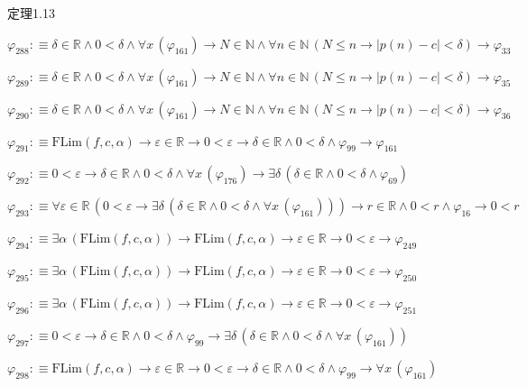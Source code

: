 \begin{fullproof}{定理1.13}
\begin{abbrevlist}
\item $\varphi_{288} :\equiv \delta \in \mathbb{R} \land 0 < \delta \land \forall x\,(\varphi_{161}) \to N \in \mathbb{N} \land \forall n \in \mathbb{N}\,(N \leq n \to \lvert p(n) - c \rvert < \delta) \to \varphi_{33}$
\item $\varphi_{289} :\equiv \delta \in \mathbb{R} \land 0 < \delta \land \forall x\,(\varphi_{161}) \to N \in \mathbb{N} \land \forall n \in \mathbb{N}\,(N \leq n \to \lvert p(n) - c \rvert < \delta) \to \varphi_{35}$
\item $\varphi_{290} :\equiv \delta \in \mathbb{R} \land 0 < \delta \land \forall x\,(\varphi_{161}) \to N \in \mathbb{N} \land \forall n \in \mathbb{N}\,(N \leq n \to \lvert p(n) - c \rvert < \delta) \to \varphi_{36}$
\item $\varphi_{291} :\equiv \mathrm{FLim}(f,c,\alpha) \to \varepsilon \in \mathbb{R} \to 0 < \varepsilon \to \delta \in \mathbb{R} \land 0 < \delta \land \varphi_{99} \to \varphi_{161}$
\item $\varphi_{292} :\equiv 0 < \varepsilon \to \delta \in \mathbb{R} \land 0 < \delta \land \forall x\,(\varphi_{176}) \to \exists \delta\,(\delta \in \mathbb{R} \land 0 < \delta \land \varphi_{69})$
\item $\varphi_{293} :\equiv \forall \varepsilon \in \mathbb{R}\,(0 < \varepsilon \to \exists \delta\,(\delta \in \mathbb{R} \land 0 < \delta \land \forall x\,(\varphi_{161}))) \to r \in \mathbb{R} \land 0 < r \land \varphi_{16} \to 0 < r$
\item $\varphi_{294} :\equiv \exists \alpha\,(\mathrm{FLim}(f,c,\alpha)) \to \mathrm{FLim}(f,c,\alpha) \to \varepsilon \in \mathbb{R} \to 0 < \varepsilon \to \varphi_{249}$
\item $\varphi_{295} :\equiv \exists \alpha\,(\mathrm{FLim}(f,c,\alpha)) \to \mathrm{FLim}(f,c,\alpha) \to \varepsilon \in \mathbb{R} \to 0 < \varepsilon \to \varphi_{250}$
\item $\varphi_{296} :\equiv \exists \alpha\,(\mathrm{FLim}(f,c,\alpha)) \to \mathrm{FLim}(f,c,\alpha) \to \varepsilon \in \mathbb{R} \to 0 < \varepsilon \to \varphi_{251}$
\item $\varphi_{297} :\equiv 0 < \varepsilon \to \delta \in \mathbb{R} \land 0 < \delta \land \varphi_{99} \to \exists \delta\,(\delta \in \mathbb{R} \land 0 < \delta \land \forall x\,(\varphi_{161}))$
\item $\varphi_{298} :\equiv \mathrm{FLim}(f,c,\alpha) \to \varepsilon \in \mathbb{R} \to 0 < \varepsilon \to \delta \in \mathbb{R} \land 0 < \delta \land \varphi_{99} \to \forall x\,(\varphi_{161})$

\end{abbrevlist}
\end{fullproof}
